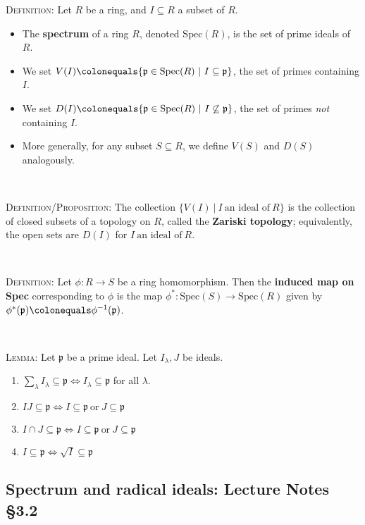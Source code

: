 \documentclass[12pt]{amsart}
\newcommand{\p}{\mathfrak{p}}
\newcommand{\Spec}{\mathrm{Spec}}
\newcommand{\0}{$\phantom{.}$}
\newcommand{\1}{\mathbbm{1}}
\newcommand\ceq{\colonequals}
\begin{document}
\noindent \textsc{Definition:} Let $R$ be a ring, and $I\subseteq R$ a subset of $R$.
\begin{itemize}
\item The \textbf{spectrum} of a ring $R$, denoted $\mathrm{Spec}(R)$, is the set of prime ideals of $R$. 
\item We set $V(I) \ceq \{ \p \in \Spec(R) \ | \ I \subseteq \p\}$, the set of primes containing $I$.
\item We set $D(I) \ceq \{ \p \in \Spec(R) \ | \ I \not\subseteq \p\}$, the set of primes \emph{not} containing $I$.
\item More generally, for any subset $S\subseteq R$, we define $V(S)$ and $D(S)$ analogously.
\end{itemize}


\

\noindent \textsc{Definition/Proposition:} The collection $\{ V(I) \ | \ I \ \text{an ideal of} \ R \}$ is the collection of closed subsets of a topology on $R$, called the \textbf{Zariski topology}; equivalently, the open sets are $D(I)$ for $I \ \text{an ideal of} \ R$.

\

\noindent \textsc{Definition:} Let $\phi: R\to S$ be a ring homomorphism. Then the \textbf{induced map on Spec} corresponding to $\phi$ is the map $\phi^*: \Spec(S) \to \Spec(R)$ given by $\phi^*(\p) \ceq \phi^{-1}(\p)$.

\

\noindent \textsc{Lemma:} Let $\p$ be a prime ideal. Let $I_\lambda,J$ be ideals.
\begin{enumerate}
\item $\sum_{\lambda} I_\lambda \subseteq \p \Longleftrightarrow I_\lambda \subseteq \p$ for all $\lambda$.
\item $IJ  \subseteq \p \Longleftrightarrow I\subseteq \p \ \text{or} \ J \subseteq \p$
\item $I \cap J \subseteq \p \Longleftrightarrow I\subseteq \p \ \text{or} \ J \subseteq \p$
\item $I \subseteq \p \Longleftrightarrow \sqrt{I} \subseteq \p$
\end{enumerate}





\newpage
\subsection{Spectrum and radical ideals: Lecture Notes \S3.2} \0
\end{document}
